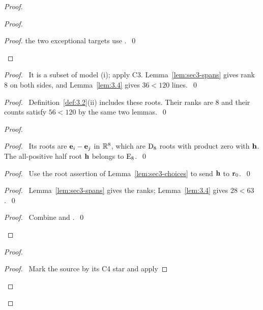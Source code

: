 \begin{proof}
\begin{proof}
\begin{proof}
   the two exceptional targets use .~\qed\end{proof}
 \end{proof}
 \begin{proof}\pf\ It is a subset of model (i); apply C3. Lemma~\ref{lem:sec3-spans}
  gives rank 8 on both sides, and Lemma~\ref{lem:3.4} gives $36<120$ lines.~\qed\end{proof}
 \begin{proof}\pf\ Definition~\ref{def:3.2}(ii) includes these roots.
  Their ranks are 8 and their counts satisfy $56<120$ by the same two lemmas.~\qed\end{proof}
 \begin{proof}
  \begin{proof}\pf\ Its roots are ${\mathbf e}_i-{\mathbf e}_j$ in ${\mathbb R}^8$, which are $\mathrm{D}_8$
   roots with product zero with ${\mathbf h}$. The all-positive half root ${\mathbf h}$ belongs to $\mathrm{E}_8$.~\qed\end{proof}
  \begin{proof}\pf\ Use the root assertion of Lemma~\ref{lem:sec3-choices}
   to send ${\mathbf h}$ to ${\mathbf r}_0$.~\qed\end{proof}
  \begin{proof}\pf\ Lemma~\ref{lem:sec3-spans} gives the ranks;
   Lemma~\ref{lem:3.4} gives $28<63$.~\qed\end{proof}
  \qedstep
  \begin{proof}\pf\ Combine  and .~\qed\end{proof}
 \end{proof}
 \begin{proof}
  \begin{proof}\pf\ Mark the source by its C4 star and apply

\end{proof}
\end{proof}
\end{proof}
